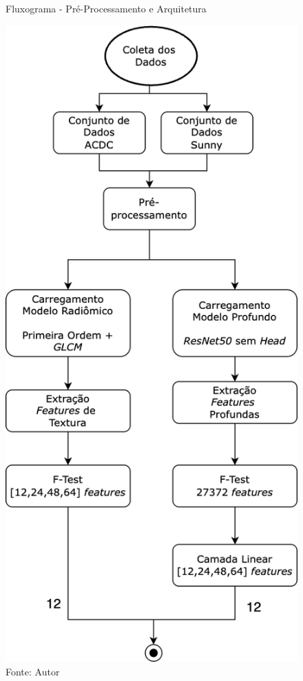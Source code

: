 \begin{figure}[H]
    \centering
    \captionsetup{width=0.98\textwidth, justification=justified}
    \caption{Fluxograma - Pré-Processamento e Arquitetura}
    \includegraphics[scale=0.38]{figures/fig015-01.png}
    \caption*{Fonte: Autor}
    \label{fig:fig015-01}
\end{figure}

